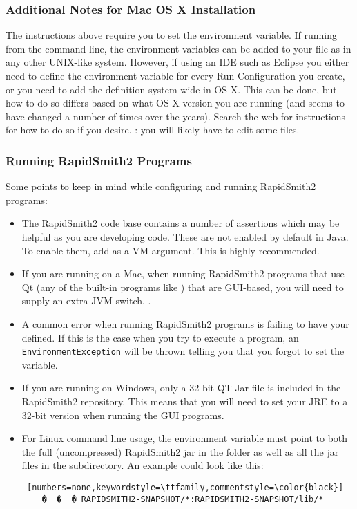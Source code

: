 \subsubsection{Additional Notes for Mac OS X Installation}

The instructions above require you to set the 
environment variable.  If running from the command line, the environment
variables can be added to your  file as in any other
UNIX-like system.  However, if using an IDE such as Eclipse you either need to
define the environment variable for every Run Configuration you create, or you
need to add the  definition system-wide in OS X. This can
be done, but how to do so differs based on what OS X version you are running
(and seems to have changed a number of times over the years). Search the web for
instructions for how to do so if you desire. : you will likely have
to edit some  files.

\subsubsection{Running RapidSmith2 Programs}
Some points to keep in mind while configuring and running RapidSmith2 programs:
\begin{itemize}
  \item The RapidSmith2 code base contains a number of assertions which may be helpful  
  as you are developing code.  These are not enabled by default in Java.  To
  enable them, add  as a VM argument.  This is highly recommended.
  \item If you are running on a Mac, when running RapidSmith2 programs that use Qt  (any
  of the built-in programs like ) that are GUI-based, you
  will need to supply an extra JVM switch, .
  \item A common error when running RapidSmith2 programs is failing to have your
   defined.  If this is the case when you try to execute a
  program, an \texttt{EnvironmentException} will be thrown telling you that you
  forgot to set the variable.
  \item If you are running on Windows, only a 32-bit QT Jar file is included in
  the RapidSmith2 repository. This means that you will need to set your JRE to a 32-bit
  version when running the GUI programs. 
  \item For Linux command line usage, the  environment variable
  must point to both the full (uncompressed) RapidSmith2 jar in the 
  folder as well as all the jar files in the  subdirectory. An example
   could look like this:
\begin{lstlisting} [numbers=none,keywordstyle=\ttfamily,commentstyle=\color{black}] 
	�  �  � RAPIDSMITH2-SNAPSHOT/*:RAPIDSMITH2-SNAPSHOT/lib/*
\end{lstlisting}
\end{itemize}


